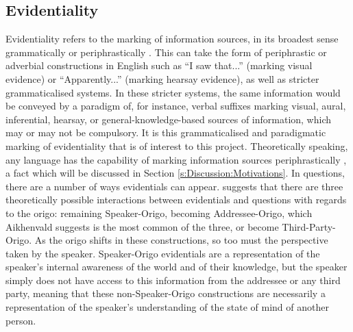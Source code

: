 \subsection{Evidentiality}\label{s:Intro:EvidentialityIntro}
Evidentiality refers to the marking of information sources, in its broadest sense grammatically or periphrastically \cite{SanRoque2019Evidentiality}. This can take the form of periphrastic or adverbial constructions in English such as ``I saw that...'' (marking visual evidence) or ``Apparently...'' (marking hearsay evidence), as well as stricter grammaticalised systems. In these stricter systems, the same information would be conveyed by a paradigm of, for instance, verbal suffixes marking visual, aural, inferential, hearsay, or general-knowledge-based sources of information, which may or may not be compulsory. It is this grammaticalised and paradigmatic marking of evidentiality that is of interest to this project. Theoretically speaking, any language has the capability of marking information sources periphrastically \cite{SanRoque2019Evidentiality}, a fact which will be discussed in Section \ref{s:Discussion:Motivations}. In questions, there are a number of ways evidentials can appear.  suggests that there are three theoretically possible interactions between evidentials and questions with regards to the origo: remaining Speaker-Origo, becoming Addressee-Origo, which Aikhenvald suggests is the most common of the three, or become Third-Party-Origo. As the origo shifts in these constructions, so too must the perspective taken by the speaker. Speaker-Origo evidentials are a representation of the speaker's internal awareness of the world and of their knowledge, but the speaker simply does not have access to this information from the addressee or any third party, meaning that these non-Speaker-Origo constructions are necessarily a representation of the speaker's understanding of the state of mind of another person.

